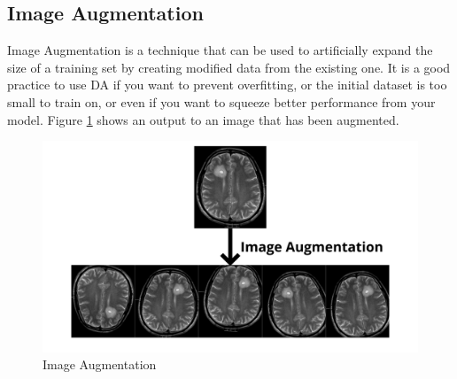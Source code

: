 \subsection{Image Augmentation}
Image Augmentation is a technique that can be used to artificially expand the size of a training set by creating modified data from the existing one. It is a good practice to use DA if you want to prevent overfitting, or the initial dataset is too small to train on, or even if you want to squeeze better performance from your model. Figure \ref{fig:ImageAugmentation} shows an output to an image that has been augmented.
\begin{figure}[H]
\includegraphics[scale=0.18]{Photos/ImageAugmentation.png}
\caption{Image Augmentation} \label{fig:ImageAugmentation}
\end{figure}
